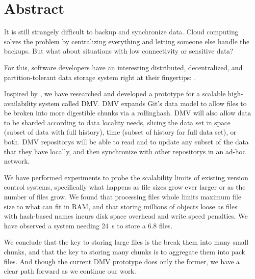 \chapter{Abstract}

\glsunsetall
{}


It is still strangely difficult to backup and synchronize data. Cloud computing
solves the problem by centralizing everything and letting someone else handle
the backups. But what about situations with low connectivity or sensitive data?


For this, software developers have an interesting distributed, decentralized,
and partition-tolerant data storage system right at their fingertips:
.


Inspired by , we have researched and
developed a prototype for a scalable high-availability system called \gls{DMV}.
\gls{DMV} expands Git's data model  to allow files to be broken into more
digestible chunks via a \gls{rollinghash}. \gls{DMV} will also allow data to be
sharded according to data locality needs, slicing the data set in space (subset
of data with full history), time (subset of history for full data set), or both.
\gls{DMV} \glspl{repository} will be able to read and to update any subset of
the data that they have locally, and then synchronize with other
\glspl{repository} in an ad-hoc network.


We have performed experiments to probe the scalability limits of existing
version control systems, specifically what happens as file sizes grow ever
larger or as the number of files grow. We found that processing files whole
limits maximum file size to what can fit in RAM, and that storing millions of
objects loose as files with hash-based names incurs disk space overhead and
write speed penalties. We have observed a system needing \SI{24}{\second} to
store a \SI{6.8}{\kib} files.





We conclude that the key to storing large files is the break them into many
small chunks, and that the key to storing many chunks is to aggregate them into
pack files. And though the current \gls{DMV} prototype does only the former, we
have a clear path forward as we continue our work.

%


\glsresetall

